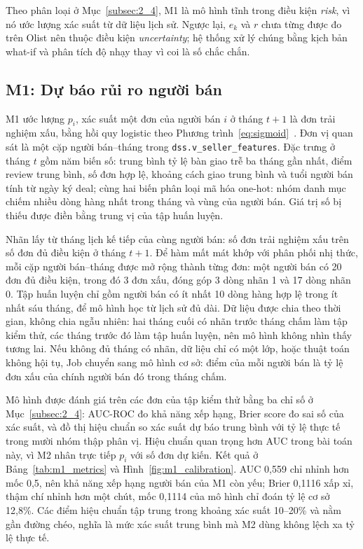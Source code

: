\documentclass[a4paper]{article}
\begin{document}
Theo phân loại ở Mục~\ref{subsec:2_4}, M1 là mô hình tĩnh trong điều kiện \textit{risk}, vì nó ước lượng xác suất từ dữ liệu lịch sử. Ngược lại, $e_k$ và $r$ chưa từng được đo trên Olist nên thuộc điều kiện \textit{uncertainty}; hệ thống xử lý chúng bằng kịch bản what-if và phân tích độ nhạy thay vì coi là số chắc chắn.

\subsection{M1: Dự báo rủi ro người bán}
\label{subsec:5_5}

M1 ước lượng $p_i$, xác suất một đơn của người bán $i$ ở tháng $t+1$ là đơn trải nghiệm xấu, bằng hồi quy logistic theo Phương trình~\eqref{eq:sigmoid}~\cite{bib:sklearn}. Đơn vị quan sát là một cặp người bán--tháng trong \texttt{dss.\allowbreak{}v\_\allowbreak{}seller\_\allowbreak{}features}. Đặc trưng ở tháng $t$ gồm năm biến số: trung bình tỷ lệ bàn giao trễ ba tháng gần nhất, điểm review trung bình, số đơn hợp lệ, khoảng cách giao trung bình và tuổi người bán tính từ ngày ký deal; cùng hai biến phân loại mã hóa one-hot: nhóm danh mục chiếm nhiều dòng hàng nhất trong tháng và vùng của người bán. Giá trị số bị thiếu được điền bằng trung vị của tập huấn luyện.

Nhãn lấy từ tháng lịch kế tiếp của cùng người bán: số đơn trải nghiệm xấu trên số đơn đủ điều kiện ở tháng $t+1$. Để hàm mất mát khớp với phân phối nhị thức, mỗi cặp người bán--tháng được mở rộng thành từng đơn: một người bán có 20 đơn đủ điều kiện, trong đó 3 đơn xấu, đóng góp 3 dòng nhãn 1 và 17 dòng nhãn 0. Tập huấn luyện chỉ gồm người bán có ít nhất 10 dòng hàng hợp lệ trong ít nhất sáu tháng, để mô hình học từ lịch sử đủ dài. Dữ liệu được chia theo thời gian, không chia ngẫu nhiên: hai tháng cuối có nhãn trước tháng chấm làm tập kiểm thử, các tháng trước đó làm tập huấn luyện, nên mô hình không nhìn thấy tương lai. Nếu không đủ tháng có nhãn, dữ liệu chỉ có một lớp, hoặc thuật toán không hội tụ, Job chuyển sang mô hình cơ sở: điểm của mỗi người bán là tỷ lệ đơn xấu của chính người bán đó trong tháng chấm.

Mô hình được đánh giá trên các đơn của tập kiểm thử bằng ba chỉ số ở Mục~\ref{subsec:2_4}: AUC-ROC đo khả năng xếp hạng, Brier score đo sai số của xác suất, và đồ thị hiệu chuẩn so xác suất dự báo trung bình với tỷ lệ thực tế trong mười nhóm thập phân vị. Hiệu chuẩn quan trọng hơn AUC trong bài toán này, vì M2 nhân trực tiếp $p_i$ với số đơn dự kiến. Kết quả ở Bảng~\ref{tab:m1_metrics} và Hình~\ref{fig:m1_calibration}. AUC 0,559 chỉ nhỉnh hơn mốc 0,5, nên khả năng xếp hạng người bán của M1 còn yếu; Brier 0,1116 xấp xỉ, thậm chí nhỉnh hơn một chút, mốc 0,1114 của mô hình chỉ đoán tỷ lệ cơ sở 12,8\%. Các điểm hiệu chuẩn tập trung trong khoảng xác suất 10--20\% và nằm gần đường chéo, nghĩa là mức xác suất trung bình mà M2 dùng không lệch xa tỷ lệ thực tế.
\end{document}
